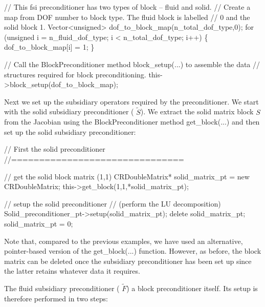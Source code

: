  
\begin{DoxyCodeInclude}
 \textcolor{comment}{// This fsi preconditioner has two types of block -- fluid and solid.}
 \textcolor{comment}{// Create a map from DOF number to block type. The fluid block is labelled}
 \textcolor{comment}{// 0 and the solid block 1.}
 Vector<unsigned> dof\_to\_block\_map(n\_total\_dof\_type,0);
 \textcolor{keywordflow}{for} (\textcolor{keywordtype}{unsigned} i = n\_fluid\_dof\_type; i < n\_total\_dof\_type; i++)
  \{
   dof\_to\_block\_map[i] = 1;
  \}
 
 \textcolor{comment}{// Call the BlockPreconditioner method block\_setup(...) to assemble the data}
 \textcolor{comment}{// structures required for block preconditioning.}
 this->block\_setup(dof\_to\_block\_map);

\end{DoxyCodeInclude}


Next we set up the subsidiary operators required by the preconditioner. We start with the solid subsidiary preconditioner ( $\tilde S$). We extract the solid matrix block $S$ from the Jacobian using the {\ttfamily Block\+Preconditioner} method {\ttfamily get\+\_\+block}(...) and then set up the solid subsidiary preconditioner\+:

 
\begin{DoxyCodeInclude}
 \textcolor{comment}{// First the solid preconditioner}
 \textcolor{comment}{//===============================}
 
 \textcolor{comment}{// get the solid block matrix (1,1)}
 CRDoubleMatrix* solid\_matrix\_pt = \textcolor{keyword}{new} CRDoubleMatrix;
 this->get\_block(1,1,*solid\_matrix\_pt);
 
 \textcolor{comment}{// setup the solid preconditioner}
 \textcolor{comment}{// (perform the LU decomposition)}
 Solid\_preconditioner\_pt->setup(solid\_matrix\_pt);
 \textcolor{keyword}{delete} solid\_matrix\_pt; solid\_matrix\_pt = 0;

\end{DoxyCodeInclude}


Note that, compared to the previous examples, we have used an alternative, pointer-\/based version of the {\ttfamily get\+\_\+block}(...) function. However, as before, the block matrix can be deleted once the subsidiary preconditioner has been set up since the latter retains whatever data it requires.

The fluid subsidiary preconditioner ( $\tilde F$) a block preconditioner itself. Its setup is therefore performed in two steps\+:


